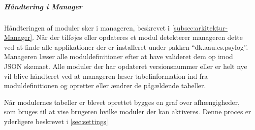 \subparagraph{Håndtering i Manager}
Håndteringen af moduler sker i manageren, beskrevet i \cref{subsec:arkitektur-Manager}.
Når der tilføjes eller opdateres et modul detekterer manageren dette ved at finde alle applikationer der er installeret under pakken ``dk.aau.cs.psylog''.
Manageren læser alle moduldefinitioner efter at have valideret dem op imod JSON skemaet.
Alle moduler der har opdateret versionsnummer eller er helt nye vil blive håndteret ved at manageren læser tabelinformation ind fra moduldefinitionen og opretter eller ændrer de pågældende tabeller.

Når modulernes tabeller er blevet oprettet bygges en graf over afhængigheder, som bruges til at vise brugeren hvilke moduler der kan aktiveres.
Denne proces er yderligere beskrevet i \cref{sec:settings}
